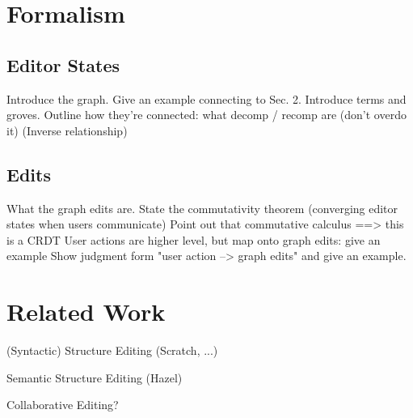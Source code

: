 \documentclass[nonacm, acmsmall, screen, review]{acmart}
\begin{document}


\section{Formalism}

\subsection{Editor States}
Introduce the graph. Give an example connecting to Sec. 2.
Introduce terms and groves.
Outline how they're connected: what decomp / recomp are (don't overdo it)
(Inverse relationship)

\subsection{Edits}
What the graph edits are.
State the commutativity theorem (converging editor states when users communicate)
Point out that commutative calculus ==> this is a CRDT
User actions are higher level, but map onto graph edits: give an example
Show judgment form "user action --> graph edits" and give an example.




\section{Related Work}

% 

(Syntactic) Structure Editing (Scratch, ...)


Semantic Structure Editing (Hazel)

Collaborative Editing?
\end{document}
